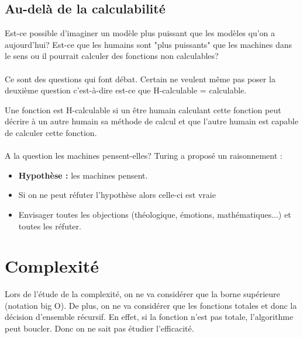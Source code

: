 \subsection{Au-delà de la calculabilité}
\label{sub:au_del_de_la_calculabilit_}
Est-ce possible d'imaginer un modèle plus puissant que les modèles qu'on a 
aujourd'hui? Est-ce que les humains sont "plus puissants" que les machines dans 
le sens ou il pourrait calculer des fonctions non calculables?

\paragraph{} Ce sont des questions qui font débat. Certain ne veulent même pas 
poser la deuxième question c'est-à-dire est-ce que H-calculable = calculable.

\begin{mydef}[H-calculable]
	Une fonction est H-calculable si un être humain calculant cette 
	fonction peut décrire à un autre humain sa méthode de calcul et que 
	l'autre humain est capable de calculer cette fonction.
\end{mydef}

\paragraph{} A la question les machines pensent-elles? Turing a proposé un 
raisonnement : 
\begin{itemize}
	\item \textbf{Hypothèse :} les machines pensent.
	\item Si on ne peut réfuter l'hypothèse alors celle-ci est vraie
	\item Envisager toutes les objections (théologique, émotions, 
		mathématiques...) et toutes les réfuter.
\end{itemize}


\section{Complexité}
\label{sec:complexit_}
Lors de l'étude de la complexité, on ne va considérer que la borne supérieure 
(notation big O). De plus, on ne va considérer que les fonctions totales et 
donc la décision d'ensemble récursif. 
En effet, si la fonction n'est pas totale, l'algorithme peut boucler. 
Donc on ne sait pas étudier l'efficacité.

